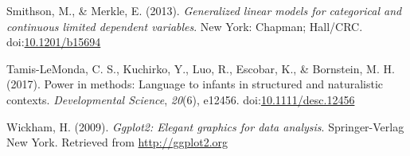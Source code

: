 \documentclass[,man,floatsintext]{apa6}
\begin{document}
\hypertarget{ref-smithson2013generalized}{}
Smithson, M., \& Merkle, E. (2013). \emph{Generalized linear models for
categorical and continuous limited dependent variables}. New York:
Chapman; Hall/CRC.
doi:\href{https://doi.org/10.1201/b15694}{10.1201/b15694}

\hypertarget{ref-tamislemonda2017power}{}
Tamis-LeMonda, C. S., Kuchirko, Y., Luo, R., Escobar, K., \& Bornstein,
M. H. (2017). Power in methods: Language to infants in structured and
naturalistic contexts. \emph{Developmental Science}, \emph{20}(6),
e12456.
doi:\href{https://doi.org/10.1111/desc.12456}{10.1111/desc.12456}

\hypertarget{ref-R-ggplot2}{}
Wickham, H. (2009). \emph{Ggplot2: Elegant graphics for data analysis}.
Springer-Verlag New York. Retrieved from \url{http://ggplot2.org}

\endgroup
\end{document}

